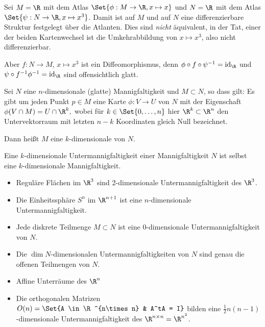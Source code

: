\begin{ex}
    Sei $M = \R$ mit dem Atlas $\Set{\phi: M \to \R, x \mapsto x}$ und $N = \R$ mit dem Atlas $\Set{\psi: N \to \R, x \mapsto x^3}$.
    Damit ist auf $M$ und auf $N$ eine differenzierbare Struktur festgelegt über die Atlanten.
    Dies sind \emph{nicht} äquivalent, in der Tat, einer der beiden Kartenwechsel ist die Umkehrabbildung von $x \mapsto x^3$, also nicht differenzierbar.

    Aber $f: N \to M$, $x \mapsto x^3$ ist ein Diffeomorphismus, denn $\phi \circ f \circ \psi^{-1} = \id_\R$ und $\psi \circ f^{-1} \phi^{-1} = \id_\R$ sind offensichtlich glatt.
\end{ex}

\begin{df} \label{2.3}
    Sei $N$ eine $n$-dimensionale (glatte) Mannigfaltigkeit und $M \subset N$,
    so dass gilt: Es gibt um jeden Punkt $p \in M$ eine Karte $\phi: V \to U$ von $N$ mit der
    Eigenschaft
    \begin{math}
        \phi(V \cap M) = U \cap \R^k,
    \end{math}
    wobei für $k \in \Set{0, \dotsc, n}$ hier $\R^k \subset \R^n$ den Untervektorraum mit letzten $n-k$ Koordinaten gleich Null bezeichnet.

    Dann heißt $M$ eine $k$-dimensionale  von $N$.
    \begin{nt*}
        Eine $k$-dimensionale Untermannigfaltigkeit einer Mannigfaltigkeit $N$ ist selbst eine $k$-dimensionale Mannigfaltigkeit.
    \end{nt*}
\end{df}

\begin{ex*}
    \begin{itemize}
        \item
            Reguläre Flächen im $\R^3$ sind 2-dimensionale Untermannigfaltigkeit des $\R^3$.
        \item
            Die Einheitssphäre $S^n$ im $\R^{n+1}$ ist eine $n$-dimensionale Untermannigfaltigkeit.
        \item
            Jede diskrete Teilmenge $M \subset N$ ist eine $0$-dimensionale Untermannigfaltigkeit von $N$.
        \item
            Die $\dim N$-dimensionalen Untermannigfaltigkeiten von $N$ sind genau die offenen Teilmengen von $N$.
        \item
            Affine Unterräume des $\R^n$
        \item
            Die orthogonalen Matrizen
            \begin{math}
                O(n) = \Set{A \in \R^{n\times n} & A^tA = I}
            \end{math}
            bilden eine $\frac{1}{2}n(n-1)$-dimensionale Untermannigfaltigkeit des $\R^{n\times n} = \R^{n^2}$.
    \end{itemize}
\end{ex*}

